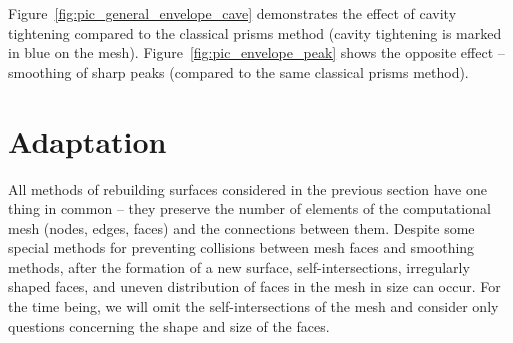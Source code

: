 \documentclass[
11pt,
tightenlines,
twoside,
onecolumn,
nofloats,
nobibnotes,
nofootinbib,
superscriptaddress,
noshowpacs,
centertags]
{revtex4}
\begin{document}
Figure~\ref{fig:pic_general_envelope_cave} demonstrates the effect
of cavity tightening compared to the classical prisms method (cavity
tightening is marked in blue on the mesh).
Figure~\ref{fig:pic_envelope_peak} shows the opposite effect --
smoothing of sharp peaks (compared to the same classical prisms
method).


\section{Adaptation}

All methods of rebuilding surfaces considered in the previous section have one thing in common -- they preserve the number of elements of the computational mesh (nodes, edges, faces) and the connections between them.
Despite some special methods for preventing collisions between mesh faces and smoothing methods, after the formation of a new surface, self-intersections, irregularly shaped faces, and uneven distribution of faces in the mesh in size can occur.
For the time being, we will omit the self-intersections of the mesh and consider only questions concerning the shape and size of the faces.
\end{document}
